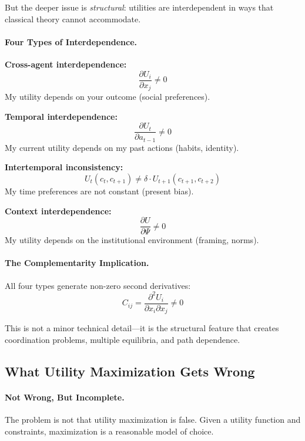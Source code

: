 But the deeper issue is \emph{structural}:
utilities are interdependent in ways that classical theory cannot accommodate.

\paragraph{Four Types of Interdependence.}

\textbf{Cross-agent interdependence:}
\begin{equation}
  \frac{\partial U_i}{\partial x_j} \neq 0
\end{equation}
My utility depends on your outcome (social preferences).

\textbf{Temporal interdependence:}
\begin{equation}
  \frac{\partial U_t}{\partial a_{t-1}} \neq 0
\end{equation}
My current utility depends on my past actions (habits, identity).

\textbf{Intertemporal inconsistency:}
\begin{equation}
  U_t(c_t, c_{t+1}) \neq \delta \cdot U_{t+1}(c_{t+1}, c_{t+2})
\end{equation}
My time preferences are not constant (present bias).

\textbf{Context interdependence:}
\begin{equation}
  \frac{\partial U}{\partial \Psi} \neq 0
\end{equation}
My utility depends on the institutional environment (framing, norms).

\paragraph{The Complementarity Implication.}
All four types generate non-zero second derivatives:
\begin{equation}
  C_{ij} = \frac{\partial^2 U_i}{\partial x_i \partial x_j} \neq 0
\end{equation}

This is not a minor technical detail---it is the structural feature
that creates coordination problems, multiple equilibria, and path dependence.

\subsection{What Utility Maximization Gets Wrong}

\paragraph{Not Wrong, But Incomplete.}
The problem is not that utility maximization is false.
Given a utility function and constraints, maximization is a reasonable model of choice.

